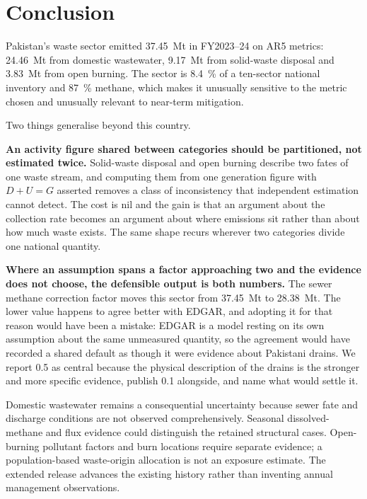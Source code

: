 \section{Conclusion}
\label{sec:conclusion}

Pakistan's waste sector emitted \SI{37.45}{\mega\tonne} \COe{} in FY2023--24 on AR5 metrics:
\SI{24.46}{\mega\tonne} from domestic wastewater, \SI{9.17}{\mega\tonne} from solid-waste
disposal and \SI{3.83}{\mega\tonne} from open burning. The sector is \SI{8.4}{\percent} of a
ten-sector national inventory and \SI{87}{\percent} methane, which makes it unusually
sensitive to the metric chosen and unusually relevant to near-term mitigation.

Two things generalise beyond this country.

\textbf{An activity figure shared between categories should be partitioned, not estimated
twice.} Solid-waste disposal and open burning describe two fates of one waste stream, and
computing them from one generation figure with $D + U = G$ asserted removes a class of
inconsistency that independent estimation cannot detect. The cost is nil and the gain is that
an argument about the collection rate becomes an argument about where emissions sit rather
than about how much waste exists. The same shape recurs wherever two categories divide one
national quantity.

\textbf{Where an assumption spans a factor approaching two and the evidence does not choose,
the defensible output is both numbers.} The sewer methane correction factor moves this sector
from \SI{37.45}{\mega\tonne} to \SI{28.38}{\mega\tonne}. The lower value happens to agree
better with EDGAR, and adopting it for that reason would have been a mistake: EDGAR is a model
resting on its own assumption about the same unmeasured quantity, so the agreement would have
recorded a shared default as though it were evidence about Pakistani drains. We report
\num{0.5} as central because the physical description of the drains is the stronger and more
specific evidence, publish \num{0.1} alongside, and name what would settle it.

Domestic wastewater remains a consequential uncertainty because sewer fate and discharge conditions are not observed comprehensively. Seasonal dissolved-methane and flux evidence could distinguish the retained structural cases. Open-burning pollutant factors and burn locations require separate evidence; a population-based waste-origin allocation is not an exposure estimate. The extended release advances the existing history rather than inventing annual management observations.
